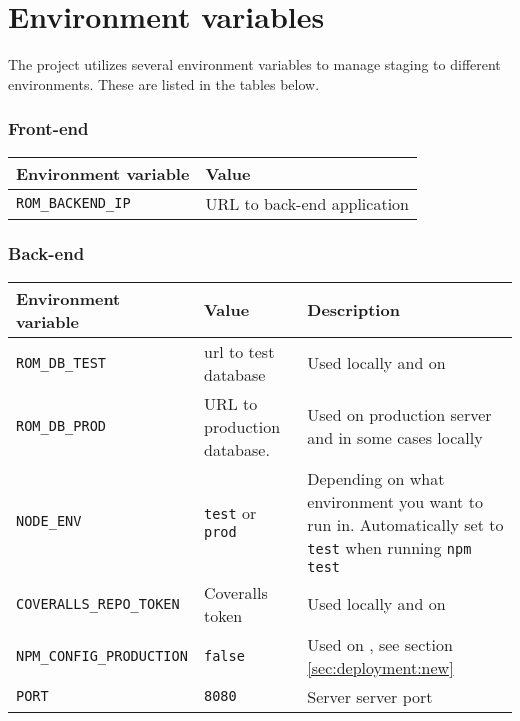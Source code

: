 \chapter{Environment variables}
\label{ch:environmentVariables}
The project utilizes several environment variables to manage staging to different environments.
These are listed in the tables below.

\subsection*{Front-end}
\begin{tabularx}{\textwidth}{|l|L|}
\hline
\textbf{Environment variable} & \textbf{Value} \\ 
\hline 

\verb+ROM_BACKEND_IP+ & URL to back-end application \\
\hline
\end{tabularx}

\subsection*{Back-end}
\begin{tabularx}{\textwidth}{|l|l|L|}
\hline
\textbf{Environment variable} & \textbf{Value} & \textbf{Description} \\
\hline 

\verb+ROM_DB_TEST+ & \gls{url} to test database & Used locally and on  \\ 
\verb+ROM_DB_PROD+ & URL to production database. & Used on production server and in some cases locally \\ 
\verb+NODE_ENV+ & \verb+test+ or \verb+prod+ & Depending on what environment you want to run in. Automatically set to \verb+test+ when running \verb+npm test+ \\ 
\verb+COVERALLS_REPO_TOKEN+ & Coveralls token & Used locally and on  \\ 
\verb+NPM_CONFIG_PRODUCTION+ & \verb+false+ & Used on , see section \ref{sec:deployment:new} \\ 
\verb+PORT+ & \verb+8080+ & Server server port \\ 
\hline
\end{tabularx}
